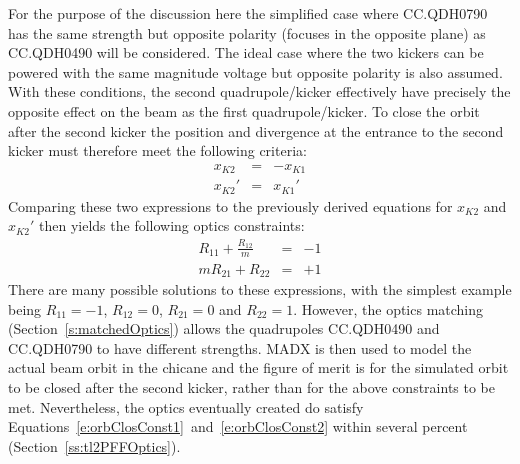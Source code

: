For the purpose of the discussion here the simplified case where CC.QDH0790 has the same strength but opposite polarity (focuses in the opposite plane) as CC.QDH0490 will be considered. The ideal case where the two kickers can be powered with the same magnitude voltage but opposite polarity is also assumed. With these conditions, the second quadrupole/kicker effectively have precisely the opposite effect on the beam as the first quadrupole/kicker. To close the orbit after the second kicker the position and divergence at the entrance to the second kicker must therefore meet the following criteria:
\begin{eqnarray}
x_{K2} &=& -x_{K1} \\
x_{K2}' &=& x_{K1}'
\end{eqnarray}
Comparing these two expressions to the previously derived equations for \(x_{K2}\) and \(x_{K2}'\) then yields the following optics constraints:
\begin{eqnarray}
R_{11} + \frac{R_{12}}{m} &=& -1  \label{e:orbClosConst1} \\
m R_{21} + R_{22} &=& +1 \label{e:orbClosConst2}
\end{eqnarray}
There are many possible solutions to these expressions, with the simplest example being \(R_{11} = -1\), \(R_{12} = 0\), \(R_{21} = 0\) and \(R_{22} = 1\). However, the optics matching (Section~\ref{s:matchedOptics}) allows the quadrupoles CC.QDH0490 and CC.QDH0790 to have different strengths. MADX is then used to model the actual beam orbit in the chicane and the figure of merit is for the simulated orbit to be closed after the second kicker, rather than for the above constraints to be met. Nevertheless, the optics eventually created do satisfy Equations~\ref{e:orbClosConst1}~and~\ref{e:orbClosConst2} within several percent (Section~\ref{ss:tl2PFFOptics}).


